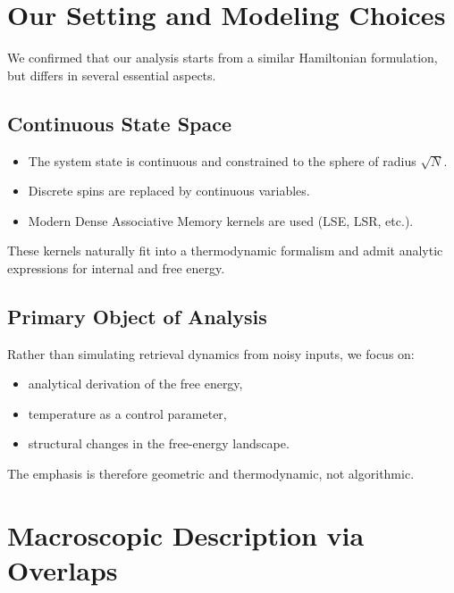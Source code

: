 \documentclass[11pt,a4paper]{article}
\begin{document}
\section{Our Setting and Modeling Choices}

We confirmed that our analysis starts from a similar Hamiltonian formulation, but differs in several essential aspects.

\subsection{Continuous State Space}

\begin{itemize}
    \item The system state is continuous and constrained to the sphere of radius $\sqrt{N}$.
    \item Discrete spins are replaced by continuous variables.
    \item Modern Dense Associative Memory kernels are used (LSE, LSR, etc.).
\end{itemize}

These kernels naturally fit into a thermodynamic formalism and admit analytic expressions for internal and free energy.

\subsection{Primary Object of Analysis}

Rather than simulating retrieval dynamics from noisy inputs, we focus on:

\begin{itemize}
    \item analytical derivation of the free energy,
    \item temperature as a control parameter,
    \item structural changes in the free-energy landscape.
\end{itemize}

The emphasis is therefore geometric and thermodynamic, not algorithmic.

\section{Macroscopic Description via Overlaps}
\end{document}
